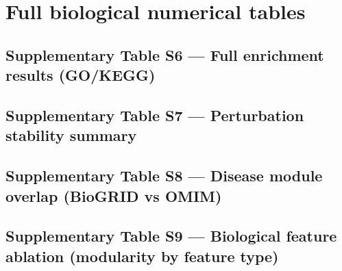 \documentclass[11pt]{article}
\begin{document}
\section{Full biological numerical tables}
\subsection*{Supplementary Table S6 --- Full enrichment results (GO/KEGG)}


\subsection*{Supplementary Table S7 --- Perturbation stability summary}


\subsection*{Supplementary Table S8 --- Disease module overlap (BioGRID vs OMIM)}


\subsection*{Supplementary Table S9 --- Biological feature ablation (modularity by feature type)}



\end{document}
